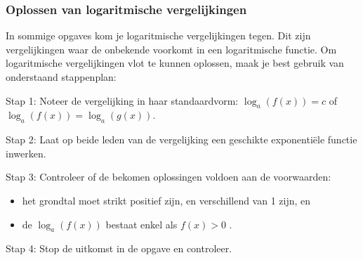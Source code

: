 \subsubsection{Oplossen van logaritmische vergelijkingen}

In sommige opgaves kom je logaritmische vergelijkingen tegen. Dit
zijn vergelijkingen waar de onbekende voorkomt in een logaritmische
functie. Om logaritmische vergelijkingen vlot te kunnen oplossen,
maak je best gebruik van onderstaand stappenplan:

Stap 1: Noteer de vergelijking in haar standaardvorm: $ \log_{a}\left(f(x)\right)=c$
of $ \log_{a}\left(f(x)\right)=\log_{a}\left(g(x)\right)$.

Stap 2: Laat op beide leden van de vergelijking een geschikte exponenti\"ele
functie inwerken.

Stap 3: Controleer of de bekomen oplossingen voldoen aan de voorwaarden:
\begin{itemize}
	\item het grondtal moet strikt positief zijn, en verschillend van 1 zijn,
	en
	\item de $ \log_{a}\left(f(x)\right)$ bestaat enkel als
	$ f(x)>0$ . 
\end{itemize}
Stap 4: Stop de uitkomst in de opgave en controleer.


